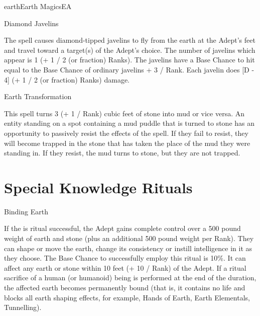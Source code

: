 \begin{College}[1.2]{earth}{Earth Magics}{EA}
\begin{spell}[S-18]{Diamond Javelins}

\begin{effects}
The spell causes diamond-tipped javelins to fly from the earth at the
Adept’s feet and travel toward a target(s) of the Adept’s choice. The
number of javelins which appear is 1 (+ 1 / 2 (or fraction) Ranks).
The javelins have a Base Chance to hit equal to the Base Chance of
ordinary javelins + 3 / Rank.  Each javelin does [D - 4] (+ 1 / 2 (or
fraction) Ranks) damage.
\end{effects}
\end{spell}

\begin{spell}[S-19]{Earth Transformation}

\begin{effects}
This spell turns 3 (+ 1 / Rank) cubic feet of stone into mud or vice
versa. An entity standing on a spot containing a mud puddle that is
turned to stone has an opportunity to passively resist the effects of
the spell.  If they fail to resist, they will become trapped in the
stone that has taken the place of the mud they were standing in.  If
they resist, the mud turns to stone, but they are not trapped.
\end{effects}
\end{spell}

\section{Special Knowledge Rituals}


\begin{ritual}[R-1]{Binding Earth}

\begin{effects}
If the is ritual successful, the Adept gains complete control over a
500 pound weight of earth and stone (plus an additional 500 pound
weight per Rank).  They can shape or move the earth, change its
consistency or instill intelligence in it as they choose.  The Base
Chance to successfully employ this ritual is 10\%.  It can affect any
earth or stone within 10 feet (+ 10 / Rank) of the Adept. If a ritual
sacrifice of a human (or humanoid) being is performed at the end of
the duration, the affected earth becomes permanently bound (that is,
it contains no life and blocks all earth shaping effects, for example,
Hands of Earth, Earth Elementals, Tunnelling).
\end{effects}
\end{ritual}

\end{College}
